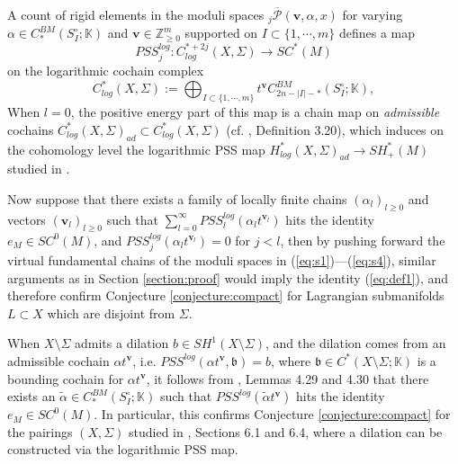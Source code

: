 \documentclass[a4paper]{article}
\numberwithin{equation}{section}
\begin{document}
A count of rigid elements in the moduli spaces ${}_j\overline{\mathcal{P}}(\mathbf{v},\alpha,x)$ for varying $\alpha\in C_\ast^\mathit{BM}(S_I^\circ;\mathbb{K})$ and $\mathbf{v}\in\mathbb{Z}_{\geq0}^m$ supported on $I\subset\{1,\cdots,m\}$ defines a map
\begin{equation}
\mathit{PSS}^\mathit{log}_j:C_\mathit{log}^{\ast+2j}(X,\Sigma)\rightarrow\mathit{SC}^\ast(M)
\end{equation}
on the logarithmic cochain complex
\begin{equation}
C_\mathit{log}^\ast(X,\Sigma):=\bigoplus_{I\subset\{1,\cdots,m\}}t^\mathbf{v}C_{2n-|I|-\ast}^\mathit{BM}(S_I^\circ;\mathbb{K}),
\end{equation}
When $l=0$, the positive energy part of this map is a chain map on \textit{admissible} cochains $C_\mathit{log}^\ast(X,\Sigma)_\mathit{ad}\subset C_\mathit{log}^\ast(X,\Sigma)$ (cf. \cite{gp1}, Definition 3.20), which induces on the cohomology level the logarithmic PSS map $H_\mathit{log}^\ast(X,\Sigma)_\mathit{ad}\rightarrow\mathit{SH}^\ast_+(M)$ studied in \cite{gp1}.

Now suppose that there exists a family of locally finite chains $(\alpha_l)_{l\geq0}$ and vectors $(\mathbf{v}_l)_{l\geq0}$ such that $\sum_{l=0}^\infty\mathit{PSS}_l^\mathit{log}(\alpha_lt^{\mathbf{v}_l})$ hits the identity $e_M\in\mathit{SC}^0(M)$, and $\mathit{PSS}_j^\mathit{log}(\alpha_lt^{\mathbf{v}_l})=0$ for $j<l$, then by pushing forward the virtual fundamental chains of the moduli spaces in (\ref{eq:s1})---(\ref{eq:s4}), similar arguments as in Section \ref{section:proof} would imply the identity (\ref{eq:def1}), and therefore confirm Conjecture \ref{conjecture:compact} for Lagrangian submanifolds $L\subset X$ which are disjoint from $\Sigma$. 

When $X\setminus\Sigma$ admits a dilation $b\in\mathit{SH}^1(X\setminus\Sigma)$, and the dilation comes from an admissible cochain $\alpha t^\mathbf{v}$, i.e. $\mathit{PSS}^\mathit{log}(\alpha t^\mathbf{v},\mathfrak{b})=b$, where $\mathfrak{b}\in C^\ast(X\setminus\Sigma;\mathbb{K})$ is a bounding cochain for $\alpha t^\mathbf{v}$, it follows from \cite{gp1}, Lemmas 4.29 and 4.30 that there exists an $\tilde{\alpha}\in C_\ast^\mathit{BM}(S_I^\circ;\mathbb{K})$ such that $\mathit{PSS}^\mathit{log}(\tilde{\alpha}t^\mathbf{v})$ hits the identity $e_M\in\mathit{SC}^0(M)$. In particular, this confirms Conjecture \ref{conjecture:compact} for the pairings $(X,\Sigma)$ studied in \cite{gp1}, Sections 6.1 and 6.4, where a dilation can be constructed via the logarithmic PSS map.
\end{document}
